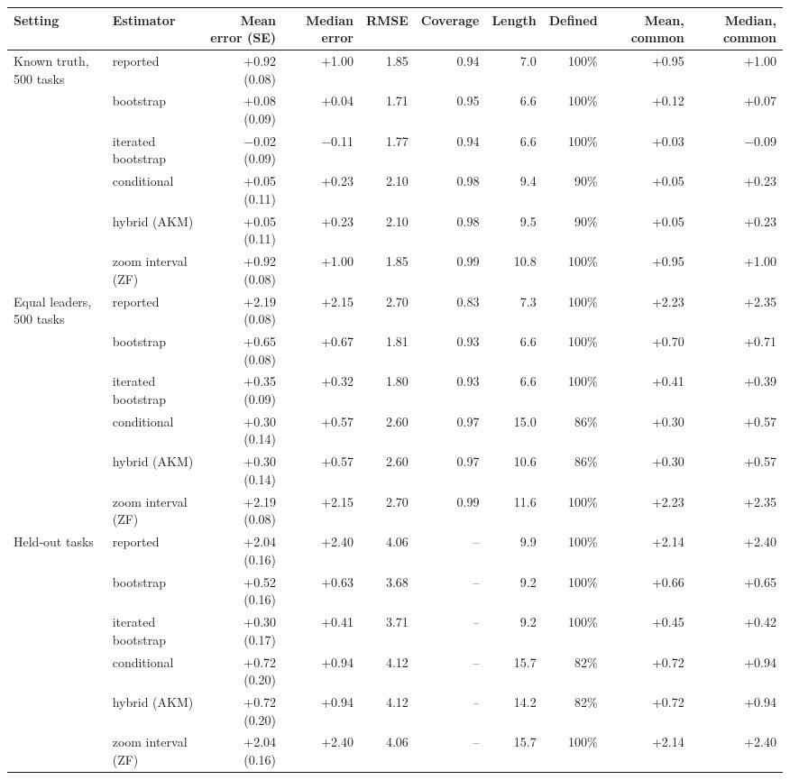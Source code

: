 \begin{tabular}{llrrrrrrrr}
\toprule
Setting & Estimator & Mean error (SE) & Median error & RMSE & Coverage & Length & Defined & Mean, common & Median, common \\
\midrule
Known truth, 500 tasks & reported & +0.92 (0.08) & +1.00 & 1.85 & 0.94 & 7.0 & 100\% & +0.95 & +1.00 \\
 & bootstrap & +0.08 (0.09) & +0.04 & 1.71 & 0.95 & 6.6 & 100\% & +0.12 & +0.07 \\
 & iterated bootstrap & $-$0.02 (0.09) & $-$0.11 & 1.77 & 0.94 & 6.6 & 100\% & +0.03 & $-$0.09 \\
 & conditional & +0.05 (0.11) & +0.23 & 2.10 & 0.98 & 9.4 & 90\% & +0.05 & +0.23 \\
 & hybrid (AKM) & +0.05 (0.11) & +0.23 & 2.10 & 0.98 & 9.5 & 90\% & +0.05 & +0.23 \\
 & zoom interval (ZF) & +0.92 (0.08) & +1.00 & 1.85 & 0.99 & 10.8 & 100\% & +0.95 & +1.00 \\
\addlinespace
Equal leaders, 500 tasks & reported & +2.19 (0.08) & +2.15 & 2.70 & 0.83 & 7.3 & 100\% & +2.23 & +2.35 \\
 & bootstrap & +0.65 (0.08) & +0.67 & 1.81 & 0.93 & 6.6 & 100\% & +0.70 & +0.71 \\
 & iterated bootstrap & +0.35 (0.09) & +0.32 & 1.80 & 0.93 & 6.6 & 100\% & +0.41 & +0.39 \\
 & conditional & +0.30 (0.14) & +0.57 & 2.60 & 0.97 & 15.0 & 86\% & +0.30 & +0.57 \\
 & hybrid (AKM) & +0.30 (0.14) & +0.57 & 2.60 & 0.97 & 10.6 & 86\% & +0.30 & +0.57 \\
 & zoom interval (ZF) & +2.19 (0.08) & +2.15 & 2.70 & 0.99 & 11.6 & 100\% & +2.23 & +2.35 \\
\addlinespace
Held-out tasks & reported & +2.04 (0.16) & +2.40 & 4.06 & -- & 9.9 & 100\% & +2.14 & +2.40 \\
 & bootstrap & +0.52 (0.16) & +0.63 & 3.68 & -- & 9.2 & 100\% & +0.66 & +0.65 \\
 & iterated bootstrap & +0.30 (0.17) & +0.41 & 3.71 & -- & 9.2 & 100\% & +0.45 & +0.42 \\
 & conditional & +0.72 (0.20) & +0.94 & 4.12 & -- & 15.7 & 82\% & +0.72 & +0.94 \\
 & hybrid (AKM) & +0.72 (0.20) & +0.94 & 4.12 & -- & 14.2 & 82\% & +0.72 & +0.94 \\
 & zoom interval (ZF) & +2.04 (0.16) & +2.40 & 4.06 & -- & 15.7 & 100\% & +2.14 & +2.40 \\

\end{tabular}
